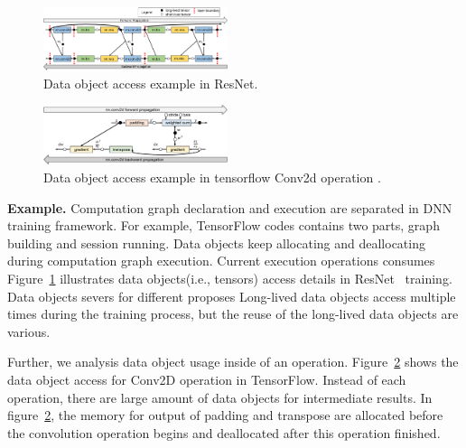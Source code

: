 \begin{figure}
\centering
\includegraphics[width=0.48\textwidth]{figures/tensor_usage.pdf}
\caption{\textcolor{jie}{Data object access example in ResNet}.}
\label{fig:tensor_usage}
\end{figure}
\begin{figure}
\centering
\includegraphics[width=0.48\textwidth]{figures/conv_tensor_usage.pdf}
\caption{\textcolor{jie}{Data object access example in tensorflow Conv2d operation }.}
\label{fig:conv_tensor_usage}
\end{figure}
\textcolor{jie}{
\textbf{Example. }
Computation graph declaration and execution are separated in DNN training framework. 
For example, TensorFlow codes contains two parts, graph building and session running. 
Data objects keep allocating and deallocating during computation graph execution. Current execution operations consumes  
Figure~\ref{fig:tensor_usage} illustrates data objects(i.e., tensors) access details in ResNet~\cite{resnet_32} training.
Data objects severs for different proposes
Long-lived data objects access multiple times during the training process, but the reuse of the long-lived data objects are various. 
}

\textcolor{jie}{Further, we analysis data object usage inside of an operation. 
Figure~\ref{fig:conv_tensor_usage} shows the data object access for Conv2D operation in TensorFlow. Instead of each operation, there are large amount of data objects for intermediate results. In figure~\ref{fig:conv_tensor_usage}, the memory for output of padding and transpose are allocated before the convolution operation begins and deallocated after this operation finished. }